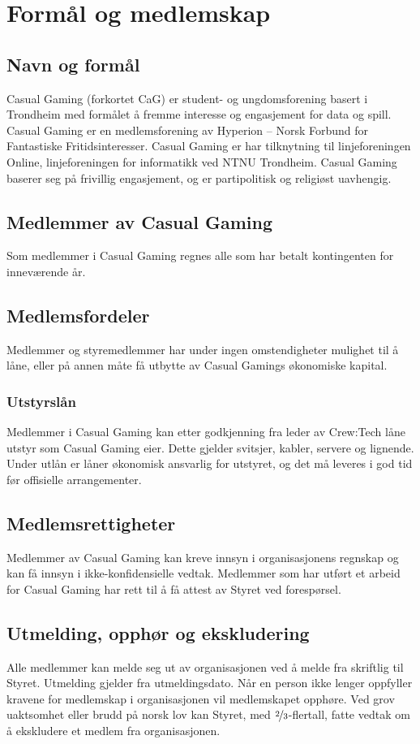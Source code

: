 \chapter{Formål og medlemskap}

\section{Navn og formål}
Casual Gaming (forkortet CaG) er student- og ungdomsforening basert i Trondheim med formålet å fremme interesse og engasjement for data og spill. Casual Gaming er en medlemsforening av Hyperion – Norsk Forbund for Fantastiske Fritidsinteresser. Casual Gaming er har tilknytning til linjeforeningen Online, linjeforeningen for informatikk ved NTNU Trondheim. Casual Gaming baserer seg på frivillig engasjement, og er partipolitisk og religiøst uavhengig.

\section{Medlemmer av Casual Gaming}
Som medlemmer i Casual Gaming regnes alle som har betalt kontingenten for inneværende år.

\section{Medlemsfordeler}
Medlemmer og styremedlemmer har under ingen omstendigheter mulighet til å låne, eller på annen måte få utbytte av Casual Gamings økonomiske kapital.

\subsection{Utstyrslån}
Medlemmer i Casual Gaming kan etter godkjenning fra leder av Crew:Tech låne utstyr som Casual Gaming eier. Dette gjelder svitsjer, kabler, servere og lignende. Under utlån er låner økonomisk ansvarlig for utstyret, og det må leveres i god tid før offisielle arrangementer.

\section{Medlemsrettigheter}
Medlemmer av Casual Gaming kan kreve innsyn i organisasjonens regnskap og kan få innsyn i ikke-konfidensielle vedtak. Medlemmer som har utført et arbeid for Casual Gaming har rett til å få attest av Styret ved forespørsel.

\section{Utmelding, opphør og ekskludering}
Alle medlemmer kan melde seg ut av organisasjonen ved å melde fra skriftlig til Styret. Utmelding gjelder fra utmeldingsdato. Når en person ikke lenger oppfyller kravene for medlemskap i organisasjonen vil medlemskapet opphøre. Ved grov uaktsomhet eller brudd på norsk lov kan Styret, med $\nicefrac{2}{3}$-flertall, fatte vedtak om å ekskludere et medlem fra organisasjonen.
